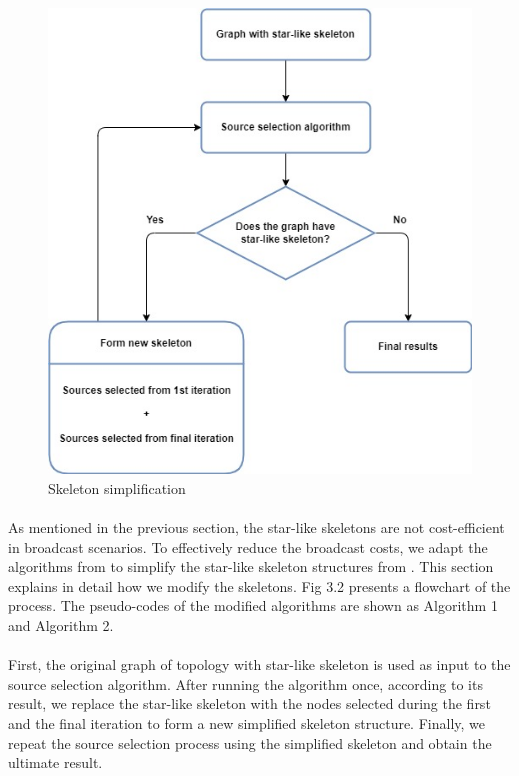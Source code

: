 \documentclass[a4paper,12pt]{report}
\begin{document}
\begin{figure}[h]
\begin{center}
\includegraphics[width=5in]{images/flow_chart.jpg}
\caption{Skeleton simplification}
\end{center}
\end{figure}

\paragraph{}
As mentioned in the previous section, the star-like skeletons are not cost-efficient in broadcast scenarios. To effectively reduce the broadcast costs, we adapt the algorithms from \cite{prose} to simplify the star-like skeleton structures from \cite{ssr}. This section explains in detail how we modify the skeletons.  Fig 3.2 presents a flowchart of the process. The pseudo-codes of the modified algorithms are shown as Algorithm 1 and Algorithm 2.

\paragraph{}
First, the original graph of topology with star-like skeleton is used as input to the source selection algorithm. After running the algorithm once, according to its result, we replace the star-like skeleton with the nodes selected during the first and the final iteration to form a new simplified skeleton structure. Finally, we repeat the source selection process using the simplified skeleton and obtain the ultimate result.
\end{document}
